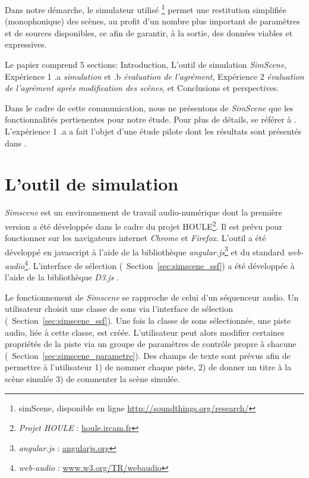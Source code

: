 \documentclass[twoside,twocolumn]{article}
\begin{document}
Dans notre démarche, le simulateur utilisé \footnote{simScene, disponible en ligne \url{http://soundthings.org/research/}} permet une restitution simplifiée (monophonique) des scènes, au profit d'un nombre plus important de paramètres et de sources disponibles, ce afin de garantir, à la sortie, des données viables et expressives.

Le papier comprend 5 sections: Introduction, L'outil de simulation \emph{SimScene}, Expérience 1 .a \emph{simulation} et .b \emph{évaluation de l'agrément}, Expérience 2 \emph{évaluation de l'agrément après modification des scènes}, et Conclusions et perspectives.

Dans le cadre de cette communication, nous ne présentons de \emph{SimScene} que les fonctionnalités pertienentes pour notre étude. Pour plus de détails, se référer à \cite{rossignol2015simscene,lafay2016JAES}. L'expérience 1 .a a fait l'objet d'une étude pilote dont les résultats sont présentés dans \cite{lafay2013atiam,lafay2014new}.



\section{L'outil de simulation}
\label{sec:simscene}

\emph{Simscene} est un environnement de travail audio-numérique dont la première version a été développée dans le cadre du projet HOULE\footnote{\emph{Projet HOULE} : \url{houle.ircam.fr}}. Il est prévu pour fonctionner sur les navigateurs internet \emph{Chrome} et \emph{Firefox}. L'outil a été développé en javascript à l'aide de la bibliothèque \emph{angular.js}\footnote{\emph{angular.js} : \url{angularjs.org}} et du standard \emph{web-audio}\footnote{\emph{web-audio} : \url{www.w3.org/TR/webaudio}}. L'interface de sélection (\cf~Section~\ref{sec:simscene_ssf}) a été développée à l'aide de la bibliothèque \emph{D3.js} \cite{d32011}.

Le fonctionnement de \emph{Simscene} se rapproche de celui d'un séquenceur audio. Un utilisateur choisit une classe de sons via l'interface de sélection (\cf~Section~\ref{sec:simscene_ssf}). Une fois la classe de sons sélectionnée, une piste audio, liée à cette classe, est créée. L'utilisateur peut alors modifier certaines propriétés de la piste via un groupe de paramètres de contrôle propre à chacune (\cf~Section~\ref{sec:simscene_parametre}). Des champs de texte sont prévus afin de permettre à l'utilisateur 1) de nommer chaque piste, 2) de donner un titre à la scène simulée 3) de commenter la scène simulée.
\end{document}
